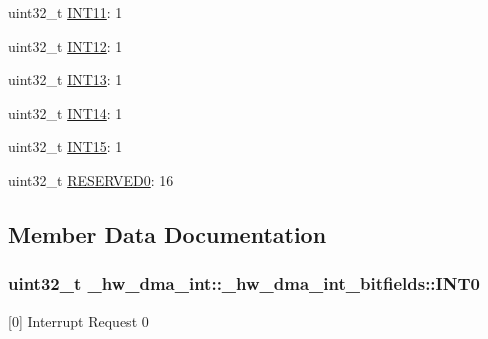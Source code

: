 \begin{DoxyCompactItemize}
\item 
uint32\+\_\+t \hyperlink{struct__hw__dma__int_1_1__hw__dma__int__bitfields_a90b86aea37d31b030815c406471a001f}{I\+N\+T11}\+: 1
\item 
uint32\+\_\+t \hyperlink{struct__hw__dma__int_1_1__hw__dma__int__bitfields_a7d3b5630c2ae254fba5e045a6d89161a}{I\+N\+T12}\+: 1
\item 
uint32\+\_\+t \hyperlink{struct__hw__dma__int_1_1__hw__dma__int__bitfields_aa3c7e297291c7cc297153d04dbb821f7}{I\+N\+T13}\+: 1
\item 
uint32\+\_\+t \hyperlink{struct__hw__dma__int_1_1__hw__dma__int__bitfields_ab64e1987a19f90b2d6f0c52cc733a4ec}{I\+N\+T14}\+: 1
\item 
uint32\+\_\+t \hyperlink{struct__hw__dma__int_1_1__hw__dma__int__bitfields_a140a556ae2232d8fa37d1141db89443f}{I\+N\+T15}\+: 1
\item 
uint32\+\_\+t \hyperlink{struct__hw__dma__int_1_1__hw__dma__int__bitfields_a04906fc822b0f25e285dab070469776a}{R\+E\+S\+E\+R\+V\+E\+D0}\+: 16
\end{DoxyCompactItemize}


\subsection{Member Data Documentation}
\subsubsection[{\texorpdfstring{I\+N\+T0}{INT0}}]{\setlength{\rightskip}{0pt plus 5cm}uint32\+\_\+t \+\_\+hw\+\_\+dma\+\_\+int\+::\+\_\+hw\+\_\+dma\+\_\+int\+\_\+bitfields\+::\+I\+N\+T0}\hypertarget{struct__hw__dma__int_1_1__hw__dma__int__bitfields_a0484e9243f0e9091cd0d3dbf4db85f1d}{}\label{struct__hw__dma__int_1_1__hw__dma__int__bitfields_a0484e9243f0e9091cd0d3dbf4db85f1d}
\mbox{[}0\mbox{]} Interrupt Request 0 
